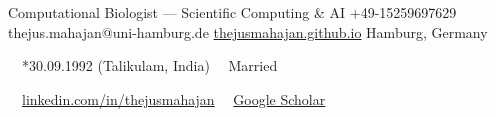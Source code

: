 \documentclass{thejus_cv}
\begin{document}
         {Computational Biologist --- Scientific Computing \& AI}
         {+49-15259697629}
         {thejus.mahajan@uni-hamburg.de}
         {\href{https://thejusmahajan.github.io}{thejusmahajan.github.io}}
         {Hamburg, Germany}

\vspace{-0.5cm}
{\small\color{white}
\faCalendar\ \ *30.09.1992 (Talikulam, India) \hspace{0.5cm} \faUser\ \ Married
}\par
\vspace{0.1cm}
{\small\color{white}
\faLinkedin\ \ \href{https://www.linkedin.com/in/thejusmahajan/}{linkedin.com/in/thejusmahajan}
\hspace{0.5cm}
\faGraduationCap\ \ \href{https://scholar.google.com/citations?user=PJkZwAwAAAAJ}{Google Scholar}
}\par
\vspace{0.1cm}
\end{document}
